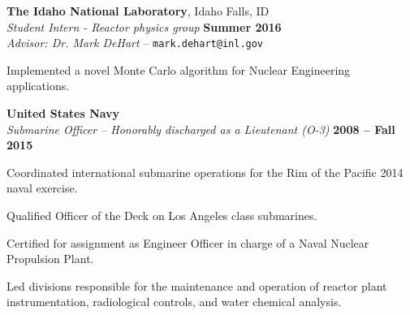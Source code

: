 \documentclass[margin,line]{resume}
\begin{document}
\begin{resume}
\begin{list2}
                \end{list2}

    \textbf{The Idaho National Laboratory}, Idaho Falls, ID \\
                \textsl{Student Intern - Reactor physics group} \hfill
                \textbf{Summer 2016}\\
                \textsl{Advisor: Dr. Mark DeHart} --
                \verb`mark.dehart@inl.gov`
                \begin{list2}
                \item[] Implemented a novel Monte Carlo algorithm for Nuclear
                Engineering applications.
                \end{list2}
    \textbf{United States Navy} \\
    \textsl{Submarine Officer -- Honorably discharged as a Lieutenant (O-3)} \hfill \textbf{2008 -- Fall 2015}
    \\\vspace{-3mm}
    \begin{list2}
    \item Coordinated international submarine operations for the Rim of the Pacific 2014 naval exercise.
    \item Qualified Officer of the Deck on Los Angeles class submarines.
    \item Certified for assignment as Engineer Officer in charge of a Naval Nuclear Propulsion Plant.
    \item Led divisions responsible for the maintenance and operation of reactor plant instrumentation, radiological controls, and water chemical analysis.
          \end{list2}
                

\end{resume}
\end{document}
